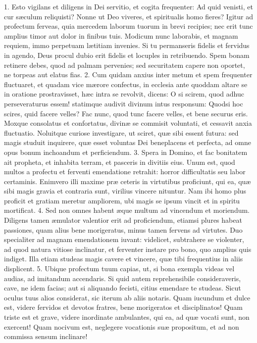 \documentclass[twoside]{article}
\begin{document}
1. Esto vigilans et diligens in Dei servitio, et cogita frequenter: Ad quid venisti, et cur sæculum reliquisti? Nonne ut Deo viveres, et spiritualis homo fieres? Igitur ad profectum ferveas, quia mercedem laborum tuorum in brevi recipies; nec erit tunc amplius timor aut dolor in finibus tuis. Modicum nunc laborabis, et magnam requiem, immo perpetuam lætitiam invenies. Si tu permanseris fidelis et fervidus in agendo, Deus procul dubio erit fidelis et locuples in retribuendo. Spem bonam retinere debes, quod ad palmam pervenies; sed securitatem capere non oportet, ne torpeas aut elatus fias.
2. Cum quidam anxius inter metum et spem frequenter fluctuaret, et quadam vice mærore confectus, in ecclesia ante quoddam altare se in oratione prostravisset, hæc intra se revolvit, dicens: O si scirem, quod adhuc perseveraturus essem! statimque audivit divinum intus responsum: Quodsi hoc scires, quid facere velles? Fac nunc, quod tunc facere velles, et bene securus eris. Moxque consolatus et confortatus, divinæ se commisit voluntati, et cessavit anxia fluctuatio. Noluitque curiose investigare, ut sciret, quæ sibi essent futura: sed magis studuit inquirere, quæ esset voluntas Dei beneplacens et perfecta, ad omne opus bonum inchoandum et perficiendum.
3. Spera in Domino, et fac bonitatem ait propheta, et inhabita terram, et pasceris in divitiis eius. Unum est, quod multos a profectu et ferventi emendatione retrahit: horror difficultatis seu labor certaminis. Enimvero illi maxime præ ceteris in virtutibus proficiunt, qui ea, quæ sibi magis gravia et contraria sunt, virilius vincere nituntur. Nam ibi homo plus proficit et gratiam meretur ampliorem, ubi magis se ipsum vincit et in spiritu mortificat.
4. Sed non omnes habent æque multum ad vincendum et moriendum. Diligens tamen æmulator valentior erit ad proficiendum, etiamsi plures habeat passiones, quam alius bene morigeratus, minus tamen fervens ad virtutes. Duo specialiter ad magnam emendationem iuvant: videlicet, subtrahere se violenter, ad quod natura vitiose inclinatur, et ferventer instare pro bono, quo amplius quis indiget. Illa etiam studeas magis cavere et vincere, quæ tibi frequentius in aliis displicent.
5. Ubique profectum tuum capias, ut, si bona exempla videas vel audias, ad imitandum accendaris. Si quid autem reprehensibile consideraveris, cave, ne idem facias; aut si aliquando fecisti, citius emendare te studeas. Sicut oculus tuus alios considerat, sic iterum ab aliis notaris. Quam iucundum et dulce est, videre fervidos et devotos fratres, bene morigeratos et disciplinatos! Quam triste est et grave, videre inordinate ambulantes, qui ea, ad quæ vocati sunt, non exercent! Quam nocivum est, neglegere vocationis suæ propositum, et ad non commissa sensum inclinare!
\end{document}
